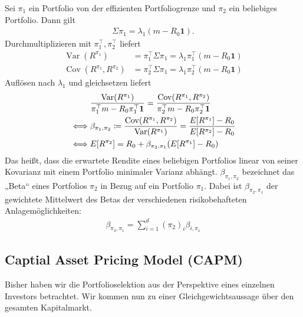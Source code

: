 \documentclass[a4paper,twoside,DIV15,BCOR12mm]{scrbook}
\DeclareMathOperator{\Var}{Var}
\DeclareMathOperator{\Cov}{Cov}
\begin{document}
Sei $\pi_1$ ein Portfolio von der effizienten Portfoliogrenze und $\pi_2$ ein beliebiges Portfolio. Dann gilt
\begin{align*}
\Sigma\pi_1 = \lambda_1(m-R_0\mathbf 1).
\end{align*}
Durchmultiplizieren mit $\pi_1^\top, \pi_2^\top$ liefert
\begin{align*}
\Var(R^{\pi_1}) &= \pi_1^\top \Sigma \pi_1 = \lambda_1\pi_1^\top(m-R_0\mathbf 1) \\
\Cov(R^{\pi_1},R^{\pi_2}) &= \pi_2^\top\Sigma \pi_1 = \lambda_1 \pi_2^\top (m-R_0\mathbf 1)
\end{align*}
Auflösen nach $\lambda_1$ und gleichsetzen liefert
\begin{align*}
& \frac{\Var(R^{\pi_1})}{\pi_1^\top m - R_0 \pi_1^\top \mathbf 1} = 
\frac{\Cov(R^{\pi_1},R^{\pi_2})}{\pi_2^\top m - R_0 \pi_2 ^\top \mathbf 1} \\
\iff & \beta_{\pi_1,\pi_2} \da 
\frac{\Cov(R^{\pi_1},R^{\pi_2})}{\Var(R^{\pi_1})} =
\frac{E[R^{\pi_1}]-R_0}{E[R^{\pi_2}]-R_0} \\
\iff & E[R^{\pi_2}] = R_0 + \beta_{\pi_2,\pi_1}(E[R^{\pi_1}]-R_0)
\end{align*}
Das heißt, dass die erwartete Rendite eines beliebigen Portfolios linear von seiner Kovarianz mit einem Portfolio minimaler Varianz abhängt. $\beta_{\pi_1,\pi_2}$ bezeichnet das „Beta“ eines Portfolios $\pi_2$ in Bezug auf ein Portfolio $\pi_1$. Dabei ist $\beta_{\pi_2,\pi_1}$ der gewichtete Mittelwert des Betas der verschiedenen risikobehafteten Anlagemöglichkeiten:
\begin{align*}
\beta_{\pi_2,\pi_1} = \sum_{i=1}^d (\pi_2)_i\beta_{i,\pi_1}
\end{align*}

\subsection{Captial Asset Pricing Model (CAPM)}

Bisher haben wir die Portfolioselektion aus der Perspektive eines einzelnen Investors betrachtet. Wir kommen nun zu einer Gleichgewichtsaussage über den gesamten Kapitalmarkt.
\end{document}
